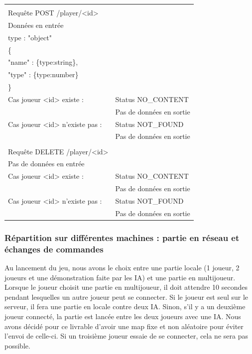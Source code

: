 \documentclass[12pt,a4paper]{article}
\begin{document}
\begin{longtable}{ll}
   & & \\
    
   Requête POST /player/<id> &  \\
   \hline
   \hline
   Données en entrée &  \\
   \hline
    type : "object" & \\
   \{ & \\
    \hspace{1cm} "name" : \{type:string\}, & \\
    \hspace{1cm} "type" : \{type:number\} & \\
   \} & \\
   \hline
   Cas joueur <id> existe : & Status NO\_CONTENT \\
   & Pas de données en sortie\\
   \hline
   Cas joueur <id> n'existe pas : & Status NOT\_FOUND \\
   & Pas de données en sortie\\

   & & \\
    
   Requête DELETE /player/<id> &  \\
   \hline
   \hline
   Pas de données en entrée &  \\
   \hline
   Cas joueur <id> existe : & Status NO\_CONTENT \\
   & Pas de données en sortie\\
   \hline
   Cas joueur <id> n'existe pas : & Status NOT\_FOUND \\
   & Pas de données en sortie\\

\end{longtable}

\subsubsection{Répartition sur différentes machines : partie en réseau et échanges de commandes}

Au lancement du jeu, nous avons le choix entre une partie locale (1 joueur, 2 joueurs et une démonstration faite par les IA) et une partie en multijoueur. Lorsque le joueur choisit une partie en multijoueur, il doit attendre 10 secondes pendant lesquelles un autre joueur peut se connecter. Si le joueur est seul sur le serveur, il fera une partie en locale contre deux IA. Sinon, s'il y a un deuxième joueur connecté, la partie est lancée entre les deux joueurs avec une IA. Nous avons décidé pour ce livrable d'avoir une map fixe et non aléatoire pour éviter l'envoi de celle-ci. Si un troisième joueur essaie de se connecter, cela ne sera pas possible.\\
\end{document}
